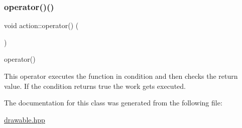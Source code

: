 \subsubsection{\texorpdfstring{operator()()}{operator()()}\hspace{0.1cm}{\footnotesize\ttfamily [2/2]}}
{\footnotesize\ttfamily void action\+::operator() (\begin{DoxyParamCaption}{ }\end{DoxyParamCaption})\hspace{0.3cm}{\ttfamily [inline]}}



operator() 

This operator executes the function in condition and then checks the return value. If the condition returns true the work gets executed. 

The documentation for this class was generated from the following file\+:\begin{DoxyCompactItemize}
\item 
\hyperlink{drawable_8hpp}{drawable.\+hpp}\end{DoxyCompactItemize}
